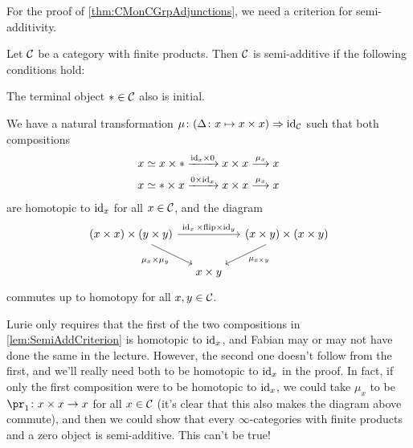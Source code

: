 For the proof of \cref{thm:CMonCGrpAdjunctions}, we need a criterion for semi-additivity.
\begin{lem}\label{lem:SemiAddCriterion}
	Let $\mathcal{C}$ be a category with finite products. Then $\mathcal{C}$ is semi-additive if the following conditions hold:
	\begin{alphanumerate}
		\item The terminal object $*\in \mathcal{C}$ also is initial.
		\item We have a natural transformation $\mu\colon (\Delta\colon x\mapsto x\times x)\Rightarrow\operatorname{id}_{\mathcal{C}}$ such that both compositions
		\begin{align*}
			x&\simeq x\times *\xrightarrow{{\id_x}\times 0} x\times x\morphism[\mu_x]x\\
			 x&\simeq *\times x\xrightarrow{0\times{\id_x}} x\times x\morphism[\mu_x]x
		\end{align*}
		are homotopic to $\operatorname{id}_x$ for all $x\in \mathcal{C}$, and the diagram
		\begin{equation*}
			\begin{tikzcd}[column sep=small]
				(x\times x)\times (y\times y)\drar["\mu_x\times \mu_y"']\ar[rr,"\id_x\times\mathrm{flip}\times \id_y"] & & (x\times y)\times (x\times y)\dlar["\mu_{x\times y}"]\\
				& x\times y & 
			\end{tikzcd}
		\end{equation*}
		commutes up to homotopy for all $x,y\in \mathcal{C}$.
	\end{alphanumerate}
\end{lem}
\begin{rem*}
	Lurie only requires that the first of the two compositions in \cref{lem:SemiAddCriterion} is homotopic to $\operatorname{id}_x$, and Fabian may or may not have done the same in the lecture. However, the second one doesn't follow from the first, and we'll really need both to be homotopic to $\operatorname{id}_x$ in the proof. In fact, if only the first composition were to be homotopic to $\operatorname{id}_x$, we could take $\mu_x$ to be $\pr_1\colon x\times x\morphism x$ for all $x\in \mathcal{C}$ (it's clear that this also makes the diagram above commute), and then we could show that every $\infty$-categories with finite products and a zero object is semi-additive. This can't be true!
\end{rem*}
